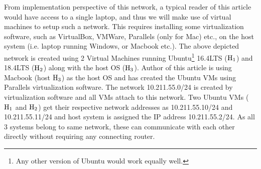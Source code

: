 \begin{multicols}{2}
From implementation perspective of this network, a typical reader of this article would have access to a single laptop, and thus we will make use of virtual machines to setup such a network. This requires installing some virtualization software, such as VirtualBox\cite{art2-key07}, VMWare\cite{art2-key09}, Parallels\cite{art2-key08} (only for Mac) etc., on the host system (i.e. laptop running Windows, or Macbook etc.). The above depicted network is created using 2 Virtual Machines running Ubuntu\footnote{Any other version of Ubuntu would work equally well.} 16.4LTS (${\rm H}_{1}$) and 18.4LTS (${\rm H}_{2}$) along with the host OS (${\rm H}_{3}$). Author of this article is using Macbook (host ${\rm H}_{3}$) as the host OS and has created the Ubuntu VMs using Parallels\cite{art2-key08} virtualization software. The network 10.211.55.0/24 is created by virtualization software and all VMs attach to this network. Two Ubuntu VMs (${\rm H}_{1}$ and ${\rm H}_{2}$) get their respective network addresses as 10.211.55.10/24 and 10.211.55.11/24 and host system is assigned the IP address 10.211.55.2/24. As all 3 systems belong to same network, these can communicate with each other directly without requiring any connecting router.
\end{multicols}

\vspace{-.7cm}

